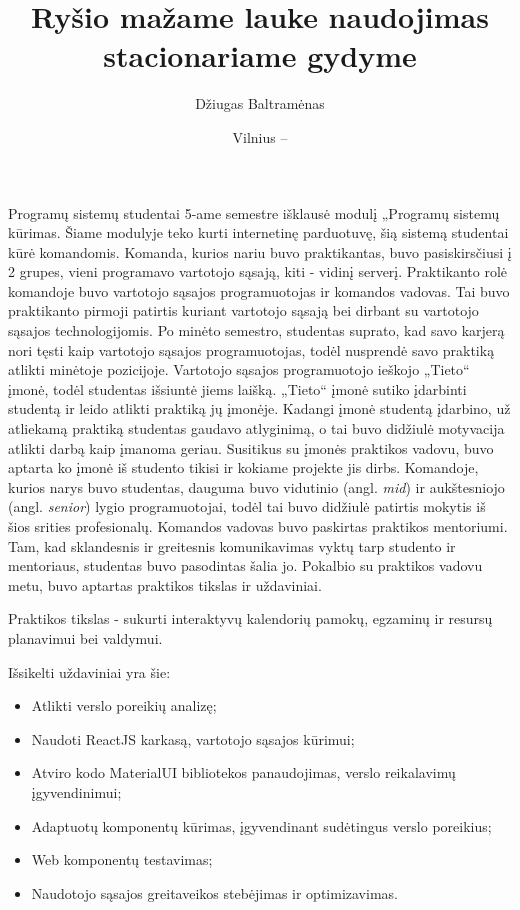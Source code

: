 \documentclass{VUMIFPSbakalaurinis}
\title{Ryšio mažame lauke naudojimas stacionariame gydyme}
\author{Džiugas Baltramėnas}
\date{Vilnius – \the\year}
\begin{document}
\maketitle

\tableofcontents

Programų sistemų studentai 5-ame semestre išklausė modulį „Programų sistemų kūrimas. Šiame modulyje teko kurti internetinę parduotuvę, šią sistemą studentai kūrė komandomis. Komanda, kurios nariu buvo praktikantas, buvo pasiskirsčiusi į 2 grupes, vieni programavo vartotojo sąsają, kiti - vidinį serverį. Praktikanto rolė komandoje buvo vartotojo sąsajos programuotojas ir komandos vadovas. Tai buvo praktikanto pirmoji patirtis kuriant vartotojo sąsają bei dirbant su vartotojo sąsajos technologijomis. Po minėto semestro, studentas suprato, kad savo karjerą nori tęsti kaip vartotojo sąsajos programuotojas, todėl nusprendė savo praktiką atlikti minėtoje pozicijoje. Vartotojo sąsajos programuotojo ieškojo „Tieto“ įmonė, todėl studentas išsiuntė jiems laišką. „Tieto“ įmonė sutiko įdarbinti studentą ir leido atlikti praktiką jų įmonėje. Kadangi įmonė studentą įdarbino, už atliekamą praktiką studentas gaudavo atlyginimą, o tai buvo didžiulė motyvacija atlikti darbą kaip įmanoma geriau. Susitikus su įmonės praktikos vadovu, buvo aptarta ko įmonė iš studento tikisi ir kokiame projekte jis dirbs. Komandoje, kurios narys buvo studentas, dauguma buvo vidutinio (angl. \textit{mid}) ir aukštesniojo (angl. \textit{senior}) lygio programuotojai, todėl tai buvo didžiulė patirtis mokytis iš šios srities profesionalų. Komandos vadovas buvo paskirtas praktikos mentoriumi. Tam, kad sklandesnis ir greitesnis komunikavimas vyktų tarp studento ir mentoriaus, studentas buvo pasodintas šalia jo. Pokalbio su praktikos vadovu metu, buvo aptartas praktikos tikslas ir uždaviniai.

Praktikos tikslas - sukurti interaktyvų kalendorių pamokų, egzaminų ir resursų planavimui bei valdymui.

Išsikelti uždaviniai yra šie:
\begin{itemize}
    \item Atlikti verslo poreikių analizę;
    \item Naudoti ReactJS karkasą, vartotojo sąsajos kūrimui;
    \item Atviro kodo MaterialUI bibliotekos panaudojimas, verslo reikalavimų įgyvendinimui;
    \item Adaptuotų komponentų kūrimas, įgyvendinant sudėtingus verslo poreikius;
    \item Web komponentų testavimas;
    \item Naudotojo sąsajos greitaveikos stebėjimas ir optimizavimas.
\end{itemize}
\end{document}
